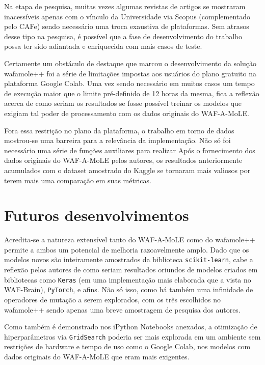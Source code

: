 Na etapa de pesquisa, muitas vezes algumas revistas de artigos se mostraram inacessíveis apenas com o vínculo da Universidade via Scopus (complementado pelo CAFe) sendo necessário uma troca exaustiva de plataformas. Sem atrasos desse tipo na pesquisa, é possível que a fase de desenvolvimento do trabalho possa ter sido adiantada e enriquecida com mais casos de teste.

Certamente um obstáculo de destaque que marcou o desenvolvimento da solução wafamole++ foi a série de limitações impostas aos usuários do plano gratuito na plataforma Google Colab. Uma vez sendo necessário em muitos casos um tempo de execução maior que o limite pré-definido de 12 horas da mesma, fica a reflexão acerca de como seriam os resultados se fosse possível treinar os modelos que exigiam tal poder de processamento com os dados originais do WAF-A-MoLE.

Fora essa restrição no plano da plataforma, o trabalho em torno de dados mostrou-se uma barreira para a relevância da implementação. Não só foi necessário uma série de funções auxiliares para realizar Após o fornecimento dos dados originais do WAF-A-MoLE pelos autores, os resultados anteriormente acumulados com o dataset amostrado do Kaggle se tornaram mais valiosos por terem mais uma comparação em suas métricas.

\section{Futuros desenvolvimentos}
Acredita-se a natureza extensível tanto do WAF-A-MoLE como do wafamole++ permite a ambos um potencial de melhoria razoavelmente amplo. Dado que os modelos novos são inteiramente amostrados da biblioteca \verb+scikit-learn+, cabe a reflexão pelos autores de como seriam resultados oriundos de modelos criados em bibliotecas como \verb+Keras+ (em uma implementação mais elaborada que a vista no WAF-Brain), \verb+PyTorch+, e afins. Não só isso, como há também uma infinidade de operadores de mutação a serem explorados, com os três escolhidos no wafamole++ sendo apenas uma breve amostragem de pesquisa dos autores.

Como também é demonstrado nos iPython Notebooks anexados, a otimização de hiperparâmetros via \verb+GridSearch+ poderia ser mais explorada em um ambiente sem restrições de hardware e tempo de uso como o Google Colab, nos modelos com dados originais do WAF-A-MoLE que eram mais exigentes. 
